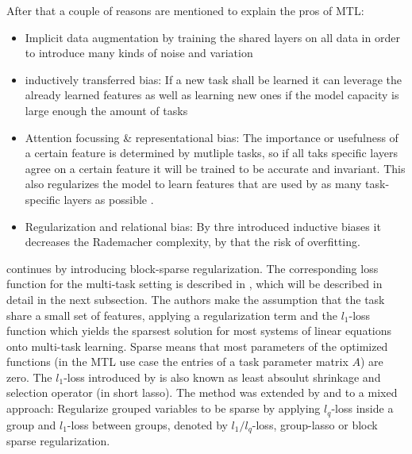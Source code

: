 After that a couple of reasons are mentioned to explain the pros of MTL:
\begin{itemize}
    \item Implicit data augmentation by training the shared layers on all data in order to introduce many kinds of noise and variation
    \item inductively transferred bias: If a new task shall be learned it can leverage the already learned features as well as learning new ones if the model capacity is large enough the amount of tasks
    \item Attention focussing \& representational bias: The importance or usefulness of a certain feature is determined by mutliple tasks, so if all taks specific layers agree on a certain feature it will be trained to be accurate and invariant. This also regularizes the model to learn features that are used by as many task-specific layers as possible \cite{DBLP:journals/corr/abs-1106-0245}.
    \item Regularization and relational bias: By thre introduced inductive biases it decreases the Rademacher complexity, by that the risk of overfitting.
\end{itemize}
\cite{DBLP:journals/corr/Ruder17a} continues by introducing block-sparse regularization. The corresponding loss function for the multi-task setting is described in \cite{Argyriou2006MultiTaskFL}, which will be described in detail in the next subsection. The authors make the assumption that the task share a small set of features, applying a regularization term and the $l_1$-loss function which yields the sparsest solution for most systems of linear equations \cite{donoho2006most}\cite{meinshausen2006} onto multi-task learning. Sparse means that most parameters of the optimized functions (in the MTL use case the entries of a task parameter matrix $A$) are zero. The $l_1$-loss introduced by \cite{doi:10.1137/0907087} is also known as least absoulut shrinkage and selection operator (in short lasso). The method was extended by \cite{bakin1999adaptive} and \cite{Yuan06modelselection} to a mixed approach: Regularize grouped variables to be sparse by applying $l_q$-loss inside a group and $l_1$-loss between groups, denoted by $l_1/l_q$-loss, group-lasso or block sparse regularization. \\
